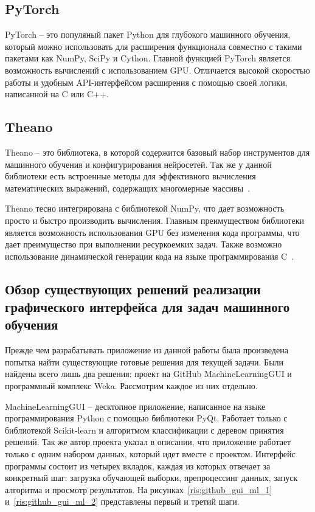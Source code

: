 \subsection{PyTorch}

PyTorch -- это популяный пакет Python для глубокого машинного обучения, который можно использовать для расширения функционала совместно с такими пакетами как NumPy, SciPy и Cython. Главной функцией PyTorch является возможность вычислений с использованием GPU. Отличается высокой скоростью работы и удобным API-интерфейсом расширения с помощью своей логики, написанной на C или C++.

\subsection{Theano}
Theano -- это библиотека, в которой содержится базовый набор инструментов для машинного обучения и конфигурирования нейросетей. Так же у данной библиотеки есть встроенные методы для эффективного вычисления математических выражений, содержащих многомерные массивы~\cite{rashka}.


Theano тесно интегрирована с библиотекой NumPy, что дает возможность просто и быстро производить вычисления. Главным преимуществом библиотеки является возможность использования GPU без изменения кода программы, что дает преимущество при выполнении ресуркоемких задач. Также возможно использование динамической генерации кода на языке программирования C~\cite{douson}.


\subsection{Обзор существующих решений реализации графического интерфейса для задач машинного обучения}

Прежде чем разрабатывать приложение из данной работы была произведена попытка найти существующие готовые решения для текущей задачи. Были найдены всего лишь два решения: проект на GitHub MachineLearningGUI и программный комплекс Weka. Рассмотрим каждое из них отдельно.


MachineLearningGUI -- десктопное приложение, написанное на языке программирования Python с помощью библиотеки PyQt. Работает только с библиотекой Scikit-learn и алгоритмом классификации с деревом принятия решений. Так же автор проекта указал в описании, что приложение работает только с одним набором данных, который идет вместе с проектом. Интерфейс программы состоит из четырех вкладок, каждая из которых отвечает за конкретный шаг: загрузка обучающей выборки, препроцессинг данных, запуск алгоритма и просмотр результатов. На рисунках~\ref{ris:github_gui_ml_1} и~\ref{ris:github_gui_ml_2} представлены первый и третий шаги.


